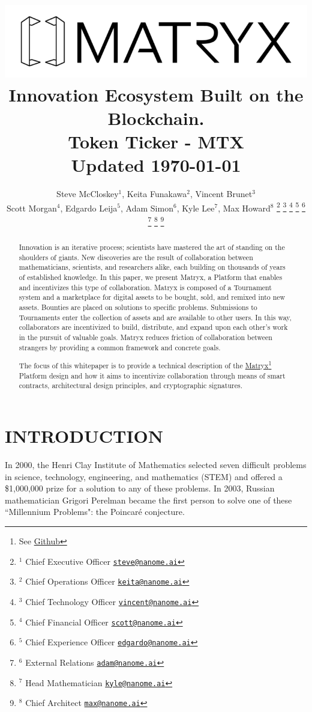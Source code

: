 \documentclass[a4paper, 10pt, conference]{ieeeconf}      %
\title{ \includegraphics[scale=.5]{logo.png}  \\
\large Innovation Ecosystem Built on the Blockchain. \\ Token Ticker - MTX \\ Updated \today
}
\author{Steve McCloskey$^{1}$, Keita Funakawa$^{2}$, Vincent Brunet$^{3}$ \\
Scott Morgan$^{4}$, Edgardo Leija$^{5}$, Adam Simon$^{6}$, Kyle Lee$^{7}$, Max Howard$^{8}$%
\thanks{$^{1}$ Chief Executive Officer 
        {\tt\small \href{mailto: steve@nanome.ai}{steve@nanome.ai}}}%
\thanks{$^{2}$ Chief Operations Officer
        {\tt\small \href{mailto: keita@nanome.ai}{keita@nanome.ai}}}%
\thanks{$^{3}$ Chief Technology Officer
        {\tt\small \href{mailto: vincent@nanome.ai}{vincent@nanome.ai}}}%
\thanks{$^{4}$ Chief Financial Officer
        {\tt\small \href{mailto: scott@nanome.ai}{scott@nanome.ai}}}%
\thanks{$^{5}$ Chief Experience Officer
        {\tt\small \href{mailto: edgardo@nanome.ai}{edgardo@nanome.ai}}}%
\thanks{$^{6}$ External Relations
        {\tt\small \href{mailto: adam@nanome.ai}{adam@nanome.ai}}}%
\thanks{$^{7}$ Head Mathematician
        {\tt\small \href{mailto: kyle@nanome.ai}{kyle@nanome.ai}}}%
\thanks{$^{8}$ Chief Architect
        {\tt\small \href{mailto:
        max@nanome.ai}{max@nanome.ai}}}%
}
\begin{document}
\maketitle
\thispagestyle{empty}
\pagestyle{empty}


\begin{abstract}

Innovation is an iterative process; scientists have mastered the art of standing on the shoulders of giants. 
New discoveries are the result of collaboration between mathematicians, scientists, and researchers alike, each building on thousands of years of established knowledge. 
In this paper, we present Matryx, a Platform that enables and incentivizes this type of collaboration. 
Matryx is composed of a Tournament system and a marketplace for digital assets to be bought, sold, and remixed into new assets. 
Bounties are placed on solutions to specific problems. 
Submissions to Tournaments enter the collection of assets and are available to other users.
In this way, collaborators are incentivized to build, distribute, and expand upon each other’s work in the pursuit of valuable goals. 
Matryx reduces friction of collaboration between strangers by providing a common framework and concrete goals. 

The focus of this whitepaper is to provide a technical description of the \href{https://github.com/matryx/MatryxPlatform}{Matryx}\footnote{See \href{https://github.com/matryx/MatryxPlatform}{Github}} Platform design and how it aims to incentivize collaboration through means of smart contracts, architectural design principles, and cryptographic signatures.

\end{abstract}


\section{INTRODUCTION}\label{intro}
In 2000, the Henri Clay Institute of Mathematics selected seven difficult problems in science, technology, engineering, and mathematics (STEM) and offered a \$1,000,000 prize for a solution to any of these problems. 
In 2003, Russian mathematician Grigori Perelman became the first person to solve one of these ``Millennium Problems": the Poincaré conjecture.
\end{document}
